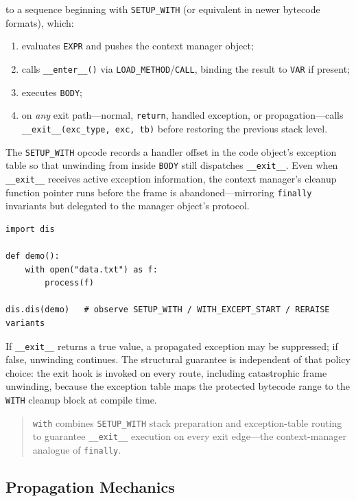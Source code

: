 \documentclass[a4paper,twoside]{report}
\begin{document}
to a sequence beginning with \texttt{SETUP\_WITH} (or equivalent in newer bytecode formats), which:

\begin{enumerate}
    \item evaluates \texttt{EXPR} and pushes the context manager object;
    \item calls \texttt{\_\_enter\_\_()} via \texttt{LOAD\_METHOD}/\texttt{CALL}, binding the result to \texttt{VAR} if present;
    \item executes \texttt{BODY};
    \item on \emph{any} exit path---normal, \texttt{return}, handled exception, or propagation---calls \texttt{\_\_exit\_\_(exc\_type, exc, tb)} before restoring the previous stack level.
\end{enumerate}

The \texttt{SETUP\_WITH} opcode records a handler offset in the code object's exception table so that unwinding from inside \texttt{BODY} still dispatches \texttt{\_\_exit\_\_}. Even when \texttt{\_\_exit\_\_} receives active exception information, the context manager's cleanup function pointer runs before the frame is abandoned---mirroring \texttt{finally} invariants but delegated to the manager object's protocol.

\begin{verbatim}
import dis

def demo():
    with open("data.txt") as f:
        process(f)

dis.dis(demo)   # observe SETUP_WITH / WITH_EXCEPT_START / RERAISE variants
\end{verbatim}

If \texttt{\_\_exit\_\_} returns a true value, a propagated exception may be suppressed; if false, unwinding continues. The structural guarantee is independent of that policy choice: the exit hook is invoked on every route, including catastrophic frame unwinding, because the exception table maps the protected bytecode range to the \texttt{WITH} cleanup block at compile time.

\begin{quote}
\texttt{with} combines \texttt{SETUP\_WITH} stack preparation and exception-table routing to guarantee \texttt{\_\_exit\_\_} execution on every exit edge---the context-manager analogue of \texttt{finally}.
\end{quote}


\subsection{Propagation Mechanics}
\end{document}
